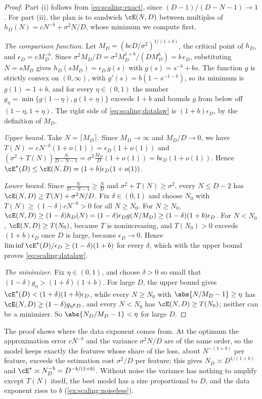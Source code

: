 \begin{refsection}
\begin{proof}
Part (i) follows from \eqref{eq:scaling:exact}, since $(D-1)/(D-N-1)\to1$. For part (ii), the plan is to sandwich $\cE(N,D)$ between multiples of $h_D(N)=cN^{-b}+\sigma^2N/D$, whose minimum we compute first.

\emph{The comparison function.} Let $M_D=(bcD/\sigma^2)^{1/(1+b)}$, the critical point of $h_D$, and $\epsilon_D=cM_D^{-b}$. Since $\sigma^2M_D/D=\sigma^2M_D^{1+b}/(DM_D^b)=b\,\epsilon_D$, substituting $N=sM_D$ gives $h_D(sM_D)=\epsilon_D\,g(s)$ with $g(s)=s^{-b}+bs$. The function $g$ is strictly convex on $(0,\infty)$, with $g'(s)=b(1-s^{-1-b})$, so its minimum is $g(1)=1+b$, and for every $\eta\in(0,1)$ the number $g_\eta=\min\{g(1-\eta),g(1+\eta)\}$ exceeds $1+b$ and bounds $g$ from below off $(1-\eta,1+\eta)$. The right side of \eqref{eq:scaling:datalaw} is $(1+b)\epsilon_D$, by the definition of $M_D$.

\emph{Upper bound.} Take $N=\lceil M_D\rceil$. Since $M_D\to\infty$ and $M_D/D\to0$, we have $T(N)=cN^{-b}(1+o(1))=\epsilon_D(1+o(1))$ and $(\sigma^2+T(N))\frac N{D-N-1}=\sigma^2\frac{M_D}D(1+o(1))=b\epsilon_D(1+o(1))$. Hence $\cE^\star(D)\le\cE(N,D)=(1+b)\epsilon_D(1+o(1))$.

\emph{Lower bound.} Since $\frac N{D-N-1}\ge\frac ND$ and $\sigma^2+T(N)\ge\sigma^2$, every $N\le D-2$ has $\cE(N,D)\ge T(N)+\sigma^2N/D$. Fix $\delta\in(0,1)$ and choose $N_0$ with $T(N)\ge(1-\delta)cN^{-b}>0$ for all $N\ge N_0$. For $N\ge N_0$, $\cE(N,D)\ge(1-\delta)h_D(N)=(1-\delta)\epsilon_Dg(N/M_D)\ge(1-\delta)(1+b)\epsilon_D$. For $N<N_0$, $\cE(N,D)\ge T(N_0)$, because $T$ is nonincreasing, and $T(N_0)>0$ exceeds $(1+b)\epsilon_D$ once $D$ is large, because $\epsilon_D\to0$. Hence $\liminf\cE^\star(D)/\epsilon_D\ge(1-\delta)(1+b)$ for every $\delta$, which with the upper bound proves \eqref{eq:scaling:datalaw}.

\emph{The minimizer.} Fix $\eta\in(0,1)$, and choose $\delta>0$ so small that $(1-\delta)g_\eta>(1+\delta)(1+b)$. For large $D$, the upper bound gives $\cE^\star(D)<(1+\delta)(1+b)\epsilon_D$, while every $N\ge N_0$ with $\abs{N/M_D-1}\ge\eta$ has $\cE(N,D)\ge(1-\delta)g_\eta\epsilon_D$, and every $N<N_0$ has $\cE(N,D)\ge T(N_0)$; neither can be a minimizer. So $\abs{N_D/M_D-1}<\eta$ for large $D$.
\end{proof}

The proof shows where the data exponent comes from. At the optimum the approximation error $cN^{-b}$ and the variance $\sigma^2N/D$ are of the same order, so the model keeps exactly the features whose share of the loss, about $N^{-(1+b)}$ per feature, exceeds the estimation cost $\sigma^2/D$ per feature; this gives $N_D\asymp D^{1/(1+b)}$ and $\cE^\star\asymp N_D^{-b}=D^{-b/(1+b)}$. Without noise the variance has nothing to amplify except $T(N)$ itself, the best model has a size proportional to $D$, and the data exponent rises to $b$ (\cref{ex:scaling:noiseless}).


\end{refsection}
